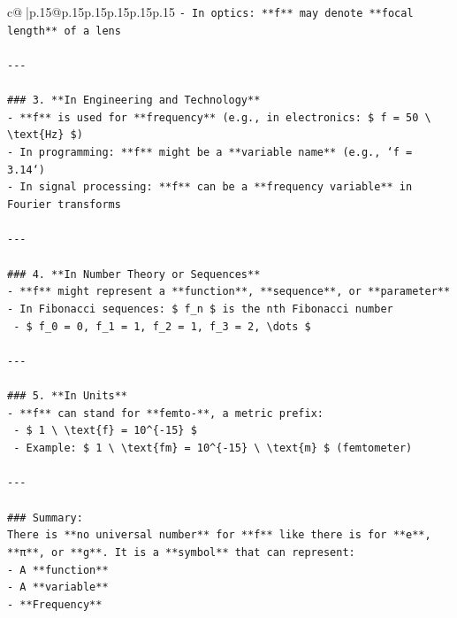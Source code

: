 \documentclass{article}
\begin{document}
{\begin{supertabular}{c@{$\;$}|p{.15\linewidth}@{}p{.15\linewidth}p{.15\linewidth}p{.15\linewidth}p{.15\linewidth}p{.15\linewidth}}
{{{\texttt{{-} In optics: **f** may denote **focal length** of a lens} \\
\\ 
\texttt{{-}{-}{-}} \\
\\ 
\texttt{\#\#\# 3. **In Engineering and Technology**} \\
\texttt{{-} **f** is used for **frequency** (e.g., in electronics: \$ f = 50 \textbackslash{} \textbackslash{}text\{Hz\} \$)} \\
\texttt{{-} In programming: **f** might be a **variable name** (e.g., `f = 3.14`)} \\
\texttt{{-} In signal processing: **f** can be a **frequency variable** in Fourier transforms} \\
\\ 
\texttt{{-}{-}{-}} \\
\\ 
\texttt{\#\#\# 4. **In Number Theory or Sequences**} \\
\texttt{{-} **f** might represent a **function**, **sequence**, or **parameter**} \\
\texttt{{-} In Fibonacci sequences: \$ f\_n \$ is the nth Fibonacci number} \\
\texttt{  {-} \$ f\_0 = 0, f\_1 = 1, f\_2 = 1, f\_3 = 2, \textbackslash{}dots \$} \\
\\ 
\texttt{{-}{-}{-}} \\
\\ 
\texttt{\#\#\# 5. **In Units**} \\
\texttt{{-} **f** can stand for **femto{-}**, a metric prefix:} \\
\texttt{  {-} \$ 1 \textbackslash{} \textbackslash{}text\{f\} = 10\^{}\{{-}15\} \$} \\
\texttt{  {-} Example: \$ 1 \textbackslash{} \textbackslash{}text\{fm\} = 10\^{}\{{-}15\} \textbackslash{} \textbackslash{}text\{m\} \$ (femtometer)} \\
\\ 
\texttt{{-}{-}{-}} \\
\\ 
\texttt{\#\#\# Summary:} \\
\texttt{There is **no universal number** for **f** like there is for **e**, **π**, or **g**. It is a **symbol** that can represent:} \\
\texttt{{-} A **function**} \\
\texttt{{-} A **variable**} \\
\texttt{{-} **Frequency**} \\
}}}
\end{supertabular}}
\end{document}
